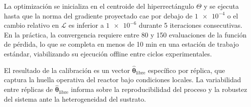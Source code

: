 La optimización se inicializa en el centroide del hiperrectángulo $\Theta$ y se ejecuta hasta que la norma del gradiente proyectado cae por debajo de $\num{1e-4}$ o el cambio relativo en $\mathcal{L}$ es inferior a $\num{1e-6}$ durante \num{5} iteraciones consecutivas. En la práctica, la convergencia requiere entre \num{80} y \num{150} evaluaciones de la función de pérdida, lo que se completa en menos de \num{10} min en una estación de trabajo estándar, viabilizando su ejecución offline entre ciclos experimentales.

El resultado de la calibración es un vector $\hat{\boldsymbol{\theta}}_{\mathrm{libre}}$ específico por réplica, que captura la huella operativa del reactor bajo condiciones locales. La variabilidad entre réplicas de $\hat{\boldsymbol{\theta}}_{\mathrm{libre}}$ informa sobre la reproducibilidad del proceso y la robustez del sistema ante la heterogeneidad del sustrato.
